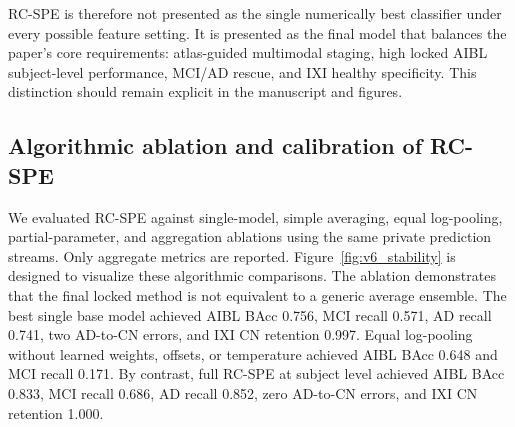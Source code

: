 \documentclass[12pt,a4paper]{article}
\begin{document}
RC-SPE is therefore not presented as the single numerically best classifier under every possible feature setting. It is presented as the final model that balances the paper's core requirements: atlas-guided multimodal staging, high locked AIBL subject-level performance, MCI/AD rescue, and IXI healthy specificity. This distinction should remain explicit in the manuscript and figures.

\subsection{Algorithmic ablation and calibration of RC-SPE}
\label{sec:algorithm_results}

We evaluated RC-SPE against single-model, simple averaging, equal log-pooling, partial-parameter, and aggregation ablations using the same private prediction streams. Only aggregate metrics are reported. Figure~\ref{fig:v6_stability} is designed to visualize these algorithmic comparisons. The ablation demonstrates that the final locked method is not equivalent to a generic average ensemble. The best single base model achieved AIBL BAcc 0.756, MCI recall 0.571, AD recall 0.741, two AD-to-CN errors, and IXI CN retention 0.997. Equal log-pooling without learned weights, offsets, or temperature achieved AIBL BAcc 0.648 and MCI recall 0.171. By contrast, full RC-SPE at subject level achieved AIBL BAcc 0.833, MCI recall 0.686, AD recall 0.852, zero AD-to-CN errors, and IXI CN retention 1.000.
\end{document}

